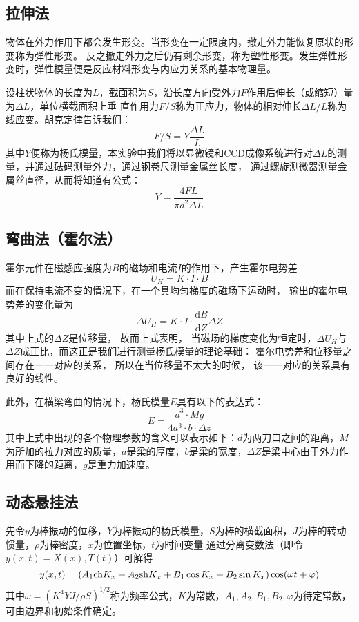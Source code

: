\documentclass[11pt]{article}
\begin{document}
\subsection{拉伸法}
物体在外力作用下都会发生形变。当形变在一定限度内，撤走外力能恢复原状的形变称为弹性形变。
反之撤走外力之后仍有剩余形变，称为塑性形变。发生弹性形变时，弹性模量便是反应材料形变与内应力关系的基本物理量。

设柱状物体的长度为$L$，截面积为$S$，沿长度方向受外力$F$作用后伸长（或缩短）量为$\Delta L$，单位横截面积上垂
直作用力$F/S$称为正应力，物体的相对伸长$\Delta L/L$称为线应变。胡克定律告诉我们：
\[
   F/S=Y\frac{\Delta L}{L} 
\]
其中$Y$便称为杨氏模量，本实验中我们将以显微镜和CCD成像系统进行对$\Delta L$的测量，并通过砝码测量外力，通过钢卷尺测量金属丝长度，
通过螺旋测微器测量金属丝直径，从而将知道有公式：
\[
    Y=\frac{4FL}{\pi d^2\Delta L}
\]

\subsection{弯曲法（霍尔法）}

霍尔元件在磁感应强度为$B$的磁场和电流$I$的作用下，产生霍尔电势差\begin{displaymath}U_H=K\cdot I\cdot B\end{displaymath}而在保持电流不变的情况下，在一个具均匀梯度的磁场下运动时，
输出的霍尔电势差的变化量为\begin{displaymath}\Delta U_H=K\cdot I\cdot \frac{\mathrm{d}B}{\mathrm{d}Z}\Delta Z\end{displaymath}其中上式的$\Delta Z$是位移量，
故而上式表明，
当磁场的梯度变化为恒定时，$\Delta U_H$与$\Delta Z$成正比，而这正是我们进行测量杨氏模量的理论基础：
霍尔电势差和位移量之间存在一一对应的关系，
所以在当位移量不太大的时候，
该一一对应的关系具有良好的线性。

此外，在横梁弯曲的情况下，杨氏模量$E$具有以下的表达式：\begin{displaymath}E=\frac{d^3\cdot Mg}{4a^3\cdot b\cdot \Delta z}\end{displaymath}其中上式中出现的各个物理参数的含义可以表示如下：$d$为两刀口之间的距离，$M$为所加的拉力对应的质量，$a$是梁的厚度，$b$是梁的宽度，$\Delta Z$是梁中心由于外力作用而下降的距离，$g$是重力加速度。

\subsection{动态悬挂法}
先令$y$为棒振动的位移，$Y$为棒振动的杨氏模量，$S$为棒的横截面积，$J$为棒的转动惯量，$\rho$为棒密度，$x$为位置坐标，$t$为时间变量
通过分离变数法（即令$y(x,t)=X(x),T(t)$）可解得
\[
    y(x,t)=\left(A_1{\rm ch}K_x+A_2{\rm sh}K_x+B_1\cos K_x+B_2\sin K_x \right)\cos (\omega t+\varphi)
\]
其中$\omega=\left(K^4YJ/\rho S\right)^{1/2}$称为频率公式，$K$为常数，$A_1,A_2,B_1,B_2,\varphi$为待定常数，可由边界和初始条件确定。
\end{document}
